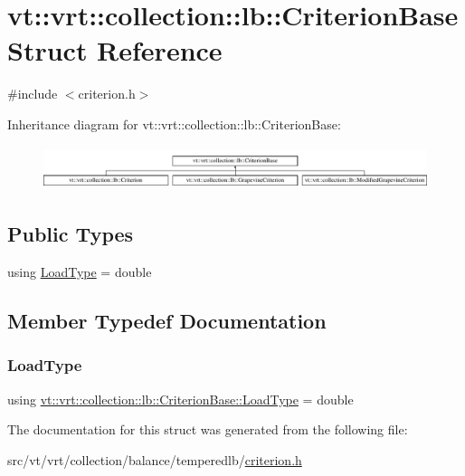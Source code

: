 \hypertarget{structvt_1_1vrt_1_1collection_1_1lb_1_1_criterion_base}{}\section{vt\+:\+:vrt\+:\+:collection\+:\+:lb\+:\+:Criterion\+Base Struct Reference}
\label{structvt_1_1vrt_1_1collection_1_1lb_1_1_criterion_base}


{\ttfamily \#include $<$criterion.\+h$>$}

Inheritance diagram for vt\+:\+:vrt\+:\+:collection\+:\+:lb\+:\+:Criterion\+Base\+:\begin{figure}[H]
\begin{center}
\leavevmode
\includegraphics[height=1.287356cm]{structvt_1_1vrt_1_1collection_1_1lb_1_1_criterion_base}
\end{center}
\end{figure}
\subsection*{Public Types}
\begin{DoxyCompactItemize}
\item 
using \hyperlink{structvt_1_1vrt_1_1collection_1_1lb_1_1_criterion_base_a78e6b14fc6f7b34acac1d7cd4e850180}{Load\+Type} = double
\end{DoxyCompactItemize}


\subsection{Member Typedef Documentation}
\mbox{\label{structvt_1_1vrt_1_1collection_1_1lb_1_1_criterion_base_a78e6b14fc6f7b34acac1d7cd4e850180}} 
\subsubsection{\texorpdfstring{Load\+Type}{LoadType}}
{\footnotesize\ttfamily using \hyperlink{structvt_1_1vrt_1_1collection_1_1lb_1_1_criterion_base_a78e6b14fc6f7b34acac1d7cd4e850180}{vt\+::vrt\+::collection\+::lb\+::\+Criterion\+Base\+::\+Load\+Type} =  double}



The documentation for this struct was generated from the following file\+:\begin{DoxyCompactItemize}
\item 
src/vt/vrt/collection/balance/temperedlb/\hyperlink{criterion_8h}{criterion.\+h}\end{DoxyCompactItemize}
